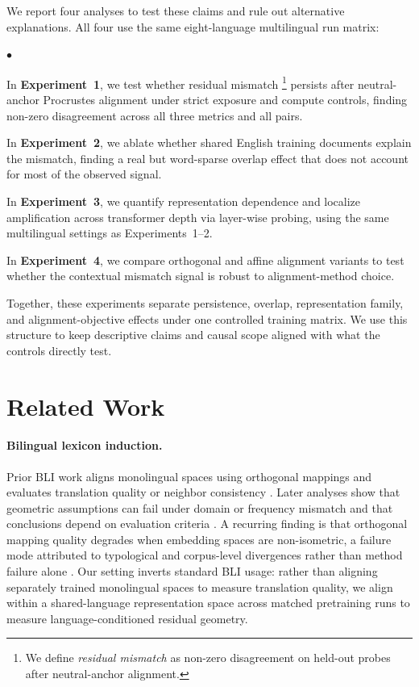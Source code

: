 \documentclass[11pt]{article}
\newcommand{\squishlist}{
    \begin{list}{$\bullet$}
    { \setlength{\itemsep}{0pt}
        \setlength{\parsep}{1pt}
        \setlength{\topsep}{1pt}
        \setlength{\partopsep}{0pt}
        \setlength{\leftmargin}{1em} %
        \setlength{\labelwidth}{1em}
        \setlength{\labelsep}{0.5em} } }
\newcommand{\squishend}{
    \end{list}  }
\begin{document}
We report four analyses to test these claims and rule out alternative explanations. All four use the same eight-language multilingual run matrix:
\squishlist
\item In \textbf{Experiment~1}, we test whether residual mismatch \footnote{We define \textit{residual mismatch} as non-zero disagreement on held-out probes after neutral-anchor alignment.} persists after neutral-anchor Procrustes alignment under strict exposure and compute controls, finding non-zero disagreement across all three metrics and all pairs.
\item In \textbf{Experiment~2}, we ablate whether shared English training documents explain the mismatch, finding a real but word-sparse overlap effect that does not account for most of the observed signal.
\item In \textbf{Experiment~3}, we quantify representation dependence and localize amplification across transformer depth via layer-wise probing, using the same multilingual settings as Experiments~1--2.
\item In \textbf{Experiment~4}, we compare orthogonal and affine alignment variants to test whether the contextual mismatch signal is robust to alignment-method choice.
\squishend
Together, these experiments separate persistence, overlap, representation family, and alignment-objective effects under one controlled training matrix. We use this structure to keep descriptive claims and causal scope aligned with what the controls directly test.

\section{Related Work}
\label{sec:related-work}
\paragraph{Bilingual lexicon induction.} Prior BLI work aligns monolingual spaces using orthogonal mappings and evaluates translation quality or neighbor consistency \citep{schonemann1966generalized,smith2017offline,conneau2018word,artetxe2018robust}. Later analyses show that geometric assumptions can fail under domain or frequency mismatch and that conclusions depend on evaluation criteria \citep{sogaard2018limitations,vulic2020we,patra2019bilingual}. A recurring finding is that orthogonal mapping quality degrades when embedding spaces are non-isometric, a failure mode attributed to typological and corpus-level divergences rather than method failure alone \citep{vulic2020we}. Our setting inverts standard BLI usage: rather than aligning separately trained monolingual spaces to measure translation quality, we align within a shared-language representation space across matched pretraining runs to measure language-conditioned residual geometry.
\end{document}
